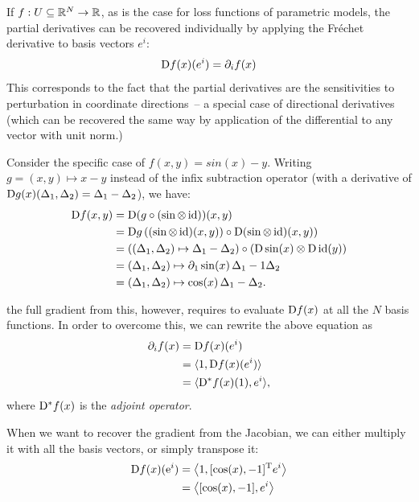 If \(f: U \subseteq \mathbb{R}^N \to \mathbb{R}\), as is the case for loss functions of parametric models, the
partial derivatives can be recovered individually by applying the Fréchet derivative to basis
vectors \(e^i\):
\begin{equation}
  \mathop{}\!\mathrm{D} f(x)({e}^i) = \partial_i f(x)
\end{equation}
This corresponds to the fact that the partial derivatives are the sensitivities to perturbation in
coordinate directions~-- a special case of directional derivatives (which can be recovered the same
way by application of the differential to any vector with unit norm.)


Consider the specific case of \(f(x, y) = sin(x) - y\).  Writing \(g = (x, y) \mapsto x - y\) instead
of the infix subtraction operator (with a derivative of
\(\mathop{}\!\mathrm{D} g(x)(\Delta_1, \Delta_2) = \Delta_1 - \Delta_2\)), we have:
\begin{equation}
  \begin{aligned}
    \mathop{}\!\mathrm{D} f(x, y) &= \mathop{}\!\mathrm{D}(g \circ (\sin \otimes \operatorname{id}))(x, y) \\
    &= \mathop{}\!\mathrm{D} g\left( (\sin \otimes \operatorname{id})(x, y)) \circ \mathop{}\!\mathrm{D}(\sin \otimes \operatorname{id})(x, y)
    \right) \\
    &= \left( (\Delta_1, \Delta_2) \mapsto \Delta_1 - \Delta_2 \right) \circ \left( \mathop{}\!\mathrm{D}\sin(x)
      \otimes \mathop{}\!\mathrm{D} \operatorname{id}(y) \right) \\
    &= (\Delta_1, \Delta_2) \mapsto \partial_1\sin(x) \, \Delta_1 - 1 \Delta_2 \\
    &= (\Delta_1, \Delta_2) \mapsto \cos(x) \, \Delta_1 - \Delta_2.
  \end{aligned}
\end{equation}


 the full gradient from this, however, requires to evaluate \(\mathop{}\!\mathrm{D} f(x)\) at
all the \(N\) basis functions.  In order to overcome this, we can rewrite the above equation as
\begin{equation}
  \begin{aligned}
    \partial_i f(x) &= \mathop{}\!\mathrm{D} f(x)({e}^i) \\
    &= \langle 1, \mathop{}\!\mathrm{D} f(x)({e}^i) \rangle \\
    &= \langle \mathop{}\!\mathrm{D}^{*} f(x)(1), {e}^i \rangle,
  \end{aligned}
\end{equation}
where \(\mathop{}\!\mathrm{D}^{*} f(x)\) is the \emph{adjoint operator}.

When we want to recover the gradient from the Jacobian, we can either multiply it with all the basis
vectors, or simply transpose it:
\begin{equation}
  \begin{aligned}
    \mathop{}\!\mathrm{D} f(x)(\mathrm{e}^i) &= \left\langle 1, [\cos(x), -1]^{\mathrm{T}} {e}^i \right\rangle \\
    &= \left\langle [\cos(x), -1], {e}^i \right\rangle
  \end{aligned}
\end{equation}

